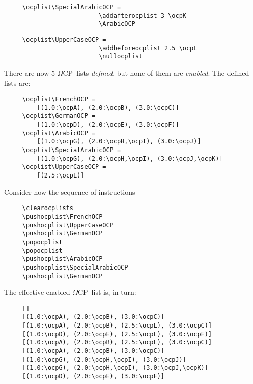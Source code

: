 \documentclass[fleqn]{article}
\newcommand{\OMEGA}{$\Omega$}
\newcommand{\OCP}{\OMEGA CP}
\begin{document}
\begin{verbatim}
     \ocplist\SpecialArabicOCP =
                          \addafterocplist 3 \ocpK
                          \ArabicOCP
\end{verbatim}

\begin{verbatim}
     \ocplist\UpperCaseOCP =
                          \addbeforeocplist 2.5 \ocpL
                          \nullocplist
\end{verbatim}
There are now 5 \OCP\ lists \emph{defined}, but none of them are
\emph{enabled}.  The defined lists are:
\begin{verbatim}
     \ocplist\FrenchOCP =
         [(1.0:\ocpA), (2.0:\ocpB), (3.0:\ocpC)]
     \ocplist\GermanOCP =
         [(1.0:\ocpD), (2.0:\ocpE), (3.0:\ocpF)]
     \ocplist\ArabicOCP =
         [(1.0:\ocpG), (2.0:\ocpH,\ocpI), (3.0:\ocpJ)]
     \ocplist\SpecialArabicOCP =
         [(1.0:\ocpG), (2.0:\ocpH,\ocpI), (3.0:\ocpJ,\ocpK)]
     \ocplist\UpperCaseOCP =
         [(2.5:\ocpL)]
\end{verbatim}
Consider now the sequence of instructions
\begin{verbatim}
     \clearocplists
     \pushocplist\FrenchOCP
     \pushocplist\UpperCaseOCP
     \pushocplist\GermanOCP
     \popocplist
     \popocplist
     \pushocplist\ArabicOCP
     \pushocplist\SpecialArabicOCP
     \pushocplist\GermanOCP
\end{verbatim}
The effective enabled \OCP\ list is, in turn:
\begin{verbatim}
     []
     [(1.0:\ocpA), (2.0:\ocpB), (3.0:\ocpC)]
     [(1.0:\ocpA), (2.0:\ocpB), (2.5:\ocpL), (3.0:\ocpC)]
     [(1.0:\ocpD), (2.0:\ocpE), (2.5:\ocpL), (3.0:\ocpF)]
     [(1.0:\ocpA), (2.0:\ocpB), (2.5:\ocpL), (3.0:\ocpC)]
     [(1.0:\ocpA), (2.0:\ocpB), (3.0:\ocpC)]
     [(1.0:\ocpG), (2.0:\ocpH,\ocpI), (3.0:\ocpJ)]
     [(1.0:\ocpG), (2.0:\ocpH,\ocpI), (3.0:\ocpJ,\ocpK)]
     [(1.0:\ocpD), (2.0:\ocpE), (3.0:\ocpF)]
\end{verbatim}
     
\end{document}
